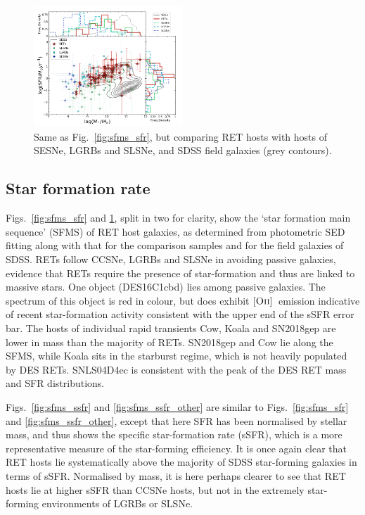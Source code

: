 \documentclass[fleqn,usenatbib,]{mnras}
\newcommand{\OII}[0]{$[\textnormal{\textsc{Oii}}]$}
\begin{document}
\begin{figure}
\includegraphics[width=0.5\textwidth]{figs/SFR_Mike_Other.png}
\caption{Same as Fig.~\ref{fig:sfms_sfr}, but comparing RET hosts with hosts of SESNe, LGRBs and SLSNe, and SDSS field galaxies (grey contours).
\label{fig:sfms_sfr_other}}
\end{figure}

\subsection{Star formation rate \label{subsec:res_sfr}}
Figs.~\ref{fig:sfms_sfr} and \ref{fig:sfms_sfr_other}, split in two for clarity, show the `star formation main sequence' (SFMS) of RET host galaxies, as determined from photometric SED fitting along with that for the comparison samples and for the field galaxies of SDSS. RETs follow CCSNe, LGRBs and SLSNe in avoiding passive galaxies, evidence that RETs require the presence of star-formation and thus are linked to massive stars. One object (DES16C1cbd) lies among passive galaxies. The spectrum of this object is red in colour, but does exhibit \OII~emission indicative of recent star-formation activity consistent with the upper end of the sSFR error bar. The hosts of individual rapid transients Cow, Koala and SN2018gep are lower in mass than the majority of RETs. SN2018gep and Cow lie along the SFMS, while Koala sits in the starburst regime, which is not heavily populated by DES RETs. SNLS04D4ec is consistent with the peak of the DES RET mass and SFR distributions. 

Figs.~\ref{fig:sfms_ssfr} and \ref{fig:sfms_ssfr_other} are similar to Figs.~\ref{fig:sfms_sfr} and \ref{fig:sfms_ssfr_other}, except that here SFR has been normalised by stellar mass, and thus shows the specific star-formation rate (sSFR), which is a more representative measure of the star-forming efficiency. It is once again clear that RET hosts lie systematically above the majority of SDSS star-forming galaxies in terms of sSFR. Normalised by mass, it is here perhaps clearer to see that RET hosts lie at higher sSFR than CCSNe hosts, but not in the extremely star-forming environments of LGRBs or SLSNe.
\end{document}
